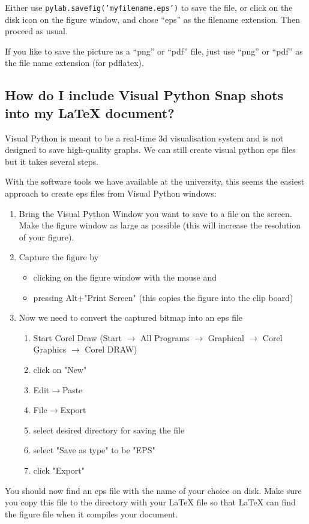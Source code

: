 \documentclass[12pt,a4paper]{article}
\begin{document}
Either use \texttt{pylab.savefig('myfilename.eps')} to save the file,
or click on the disk icon on the figure window, and chose ``eps'' as
the filename extension. Then proceed as usual.

If you like to save the picture as a ``png'' or ``pdf'' file, just use
``png'' or ``pdf'' as the file name extension (for pdflatex).


\subsection{How do I include Visual Python Snap shots into my LaTeX
  document?}
\label{sec:vpythontoeps}

Visual Python is meant to be a real-time 3d visualisation system and
is not designed to save high-quality graphs. We can still create
visual python eps files but it takes several steps.

With the software tools we have available at the university, this
seems the easiest approach to create eps files from Visual Python
windows:
\begin{enumerate}
\item Bring the Visual Python Window you want to save to a file on the
  screen. Make the figure window as large as possible (this will
  increase the resolution of your figure).

\item Capture the figure by
  \begin{itemize}
  \item clicking on the figure window with the mouse and

  \item pressing Alt+"Print Screen" (this copies the figure into the
    clip board)
  \end{itemize}

\item  Now we need to convert the captured bitmap into an eps file
  \begin{enumerate}
  \item Start Corel Draw (Start $\rightarrow$ All Programs
    $\rightarrow$ Graphical $\rightarrow$ Corel Graphics $\rightarrow$
    Corel DRAW)

  \item  click on "New"

  \item  Edit$\rightarrow$Paste
  \item  File$\rightarrow$Export
  \item  select desired directory for saving the file

  \item select "Save as type" to be "EPS"

  \item click "Export"
  \end{enumerate}
\end{enumerate}
You should now find an eps file with the name of your choice on
disk. Make sure you copy this file to the directory with your LaTeX
file so that LaTeX can find the figure file when it compiles your
document.
\end{document}
